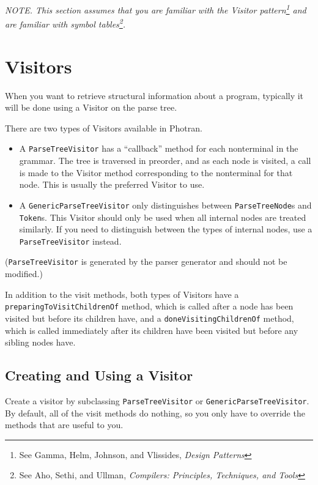
\textit{NOTE.  This section assumes that you are familiar with the Visitor
pattern\footnote{See Gamma, Helm, Johnson, and Vlissides, \textit{Design
Patterns}} and are familiar with symbol tables\footnote{See Aho, Sethi, and
Ullman, \textit{Compilers: Principles, Techniques, and Tools}}.}

\section{Visitors}

When you want to retrieve structural information about a program, typically
it will be done using a Visitor on the parse tree.

There are two types of Visitors available in Photran.
\begin{itemize}

\item A \texttt{ParseTreeVisitor} has a ``callback'' method for each nonterminal
in the grammar.  The tree is traversed in preorder, and as each node is visited,
a call is made to the Visitor method corresponding to the nonterminal for that node.
This is usually the preferred Visitor to use.

\item A \texttt{GenericParseTreeVisitor} only distinguishes between
\texttt{ParseTreeNode}s and \texttt{Token}s.  This Visitor should only be used
when all internal nodes are treated similarly.  If you need to distinguish between
the types of internal nodes, use a \texttt{ParseTreeVisitor} instead.

\end{itemize}

(\texttt{ParseTreeVisitor} is generated by the parser generator and should not
be modified.)

In addition to the visit methods, both types of Visitors have a
\texttt{preparingToVisitChildrenOf} method, which is called after a node has
been visited but before its children have, and a \texttt{doneVisitingChildrenOf}
method, which is called immediately after its children have been visited but
before any sibling nodes have.

\subsection{Creating and Using a Visitor}

Create a visitor by subclassing \texttt{ParseTreeVisitor} or
\texttt{GenericParseTreeVisitor}.  By default, all of the visit methods do
nothing, so you only have to override the methods that are useful to you.

